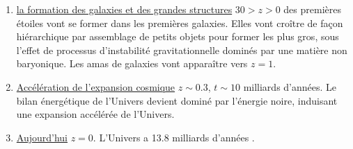 \begin{enumerate}
\item \underline{la formation des galaxies et des grandes structures} $30>z>0$ des premières étoiles vont se former dans les premières galaxies. Elles vont croître de façon hiérarchique  par assemblage de petits objets pour former les plus gros, sous l'effet de processus d'instabilité gravitationnelle dominés par une matière non baryonique. Les amas de galaxies vont apparaître vers $z=1$.
\item \underline{Accélération de l'expansion cosmique} $z\sim 0.3$, $t\sim 10$ milliards d'années. Le bilan énergétique de l'Univers devient dominé par l'énergie noire, induisant une expansion accélérée de l'Univers.
\item \underline{Aujourd'hui} $z=0$. L'Univers a 13.8 milliards d'années .
\end{enumerate}



